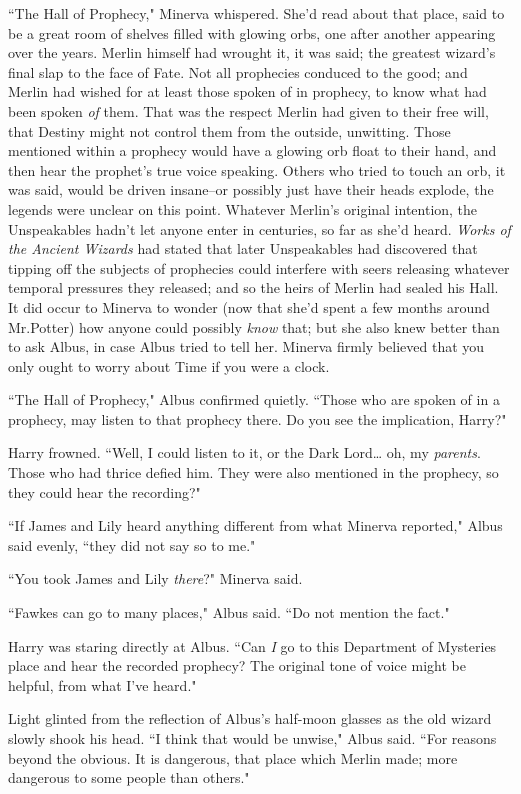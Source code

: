 ``The Hall of Prophecy," Minerva whispered. She'd read about that place, said to be a great room of shelves filled with glowing orbs, one after another appearing over the years. Merlin himself had wrought it, it was said; the greatest wizard's final slap to the face of Fate. Not all prophecies conduced to the good; and Merlin had wished for at least those spoken of in prophecy, to know what had been spoken \emph{of} them. That was the respect Merlin had given to their free will, that Destiny might not control them from the outside, unwitting. Those mentioned within a prophecy would have a glowing orb float to their hand, and then hear the prophet's true voice speaking. Others who tried to touch an orb, it was said, would be driven insane\---or possibly just have their heads explode, the legends were unclear on this point. Whatever Merlin's original intention, the Unspeakables hadn't let anyone enter in centuries, so far as she'd heard. \emph{Works of the Ancient Wizards} had stated that later Unspeakables had discovered that tipping off the subjects of prophecies could interfere with seers releasing whatever temporal pressures they released; and so the heirs of Merlin had sealed his Hall. It did occur to Minerva to wonder (now that she'd spent a few months around Mr.\?Potter) how anyone could possibly \emph{know} that; but she also knew better than to ask Albus, in case Albus tried to tell her. Minerva firmly believed that you only ought to worry about Time if you were a clock.

``The Hall of Prophecy," Albus confirmed quietly. ``Those who are spoken of in a prophecy, may listen to that prophecy there. Do you see the implication, Harry?"

Harry frowned. ``Well, I could listen to it, or the Dark Lord{\ldots} oh, my \emph{parents}. Those who had thrice defied him. They were also mentioned in the prophecy, so they could hear the recording?"

``If James and Lily heard anything different from what Minerva reported," Albus said evenly, ``they did not say so to me."

``You took James and Lily \emph{there}?" Minerva said.

``Fawkes can go to many places," Albus said. ``Do not mention the fact."

Harry was staring directly at Albus. ``Can \emph{I} go to this Department of Mysteries place and hear the recorded prophecy? The original tone of voice might be helpful, from what I've heard."

Light glinted from the reflection of Albus's half-moon glasses as the old wizard slowly shook his head. ``I think that would be unwise," Albus said. ``For reasons beyond the obvious. It is dangerous, that place which Merlin made; more dangerous to some people than others."

